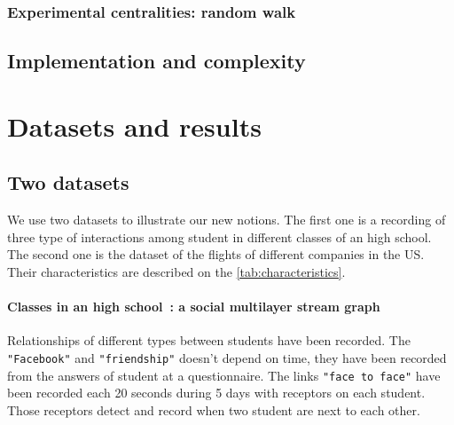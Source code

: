 \documentclass{svproc}
\begin{document}
\subsubsection{Experimental centralities: random walk}
%
\subsection{Implementation and complexity}
%

\section{Datasets and results}
%
\subsection{Two datasets}
%
We use two datasets to illustrate our new notions. The first one is a recording of three type of interactions among student in different classes of an high school. The second one is the dataset of the flights of different companies in the US. Their characteristics are described on the \cref{tab:characteristics}.
\paragraph{Classes in an high school~\cite{cpge}: a social multilayer stream graph} Relationships of different types between students have been recorded.  The \texttt{"Facebook"} and \texttt{"friendship"} doesn't depend on time, they have been recorded from the answers of student at a questionnaire. The links \texttt{"face to face"} have been recorded each 20 seconds during 5 days with receptors on each student. Those receptors detect and record when two student are next to each other.
%
\end{document}
